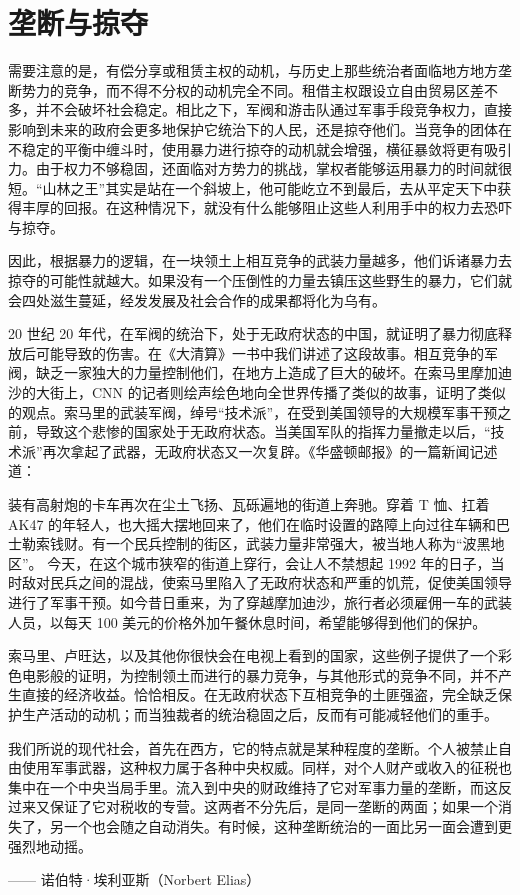 \section{垄断与掠夺}
需要注意的是，有偿分享或租赁主权的动机，与历史上那些统治者面临地方地方垄断势力的竞争，而不得不分权的动机完全不同。租借主权跟设立自由贸易区差不多，并不会破坏社会稳定。相比之下，军阀和游击队通过军事手段竞争权力，直接影响到未来的政府会更多地保护它统治下的人民，还是掠夺他们。当竞争的团体在不稳定的平衡中缠斗时，使用暴力进行掠夺的动机就会增强，横征暴敛将更有吸引力。由于权力不够稳固，还面临对方势力的挑战，掌权者能够运用暴力的时间就很短。“山林之王”其实是站在一个斜坡上，他可能屹立不到最后，去从平定天下中获得丰厚的回报。在这种情况下，就没有什么能够阻止这些人利用手中的权力去恐吓与掠夺。

因此，根据暴力的逻辑，在一块领土上相互竞争的武装力量越多，他们诉诸暴力去掠夺的可能性就越大。如果没有一个压倒性的力量去镇压这些野生的暴力，它们就会四处滋生蔓延，经发发展及社会合作的成果都将化为乌有。

20 世纪 20 年代，在军阀的统治下，处于无政府状态的中国，就证明了暴力彻底释放后可能导致的伤害。在《大清算》一书中我们讲述了这段故事。相互竞争的军阀，缺乏一家独大的力量控制他们，在地方上造成了巨大的破坏。在索马里摩加迪沙的大街上，CNN 的记者则绘声绘色地向全世界传播了类似的故事，证明了类似的观点。索马里的武装军阀，绰号“技术派”，在受到美国领导的大规模军事干预之前，导致这个悲惨的国家处于无政府状态。当美国军队的指挥力量撤走以后，“技术派”再次拿起了武器，无政府状态又一次复辟。《华盛顿邮报》的一篇新闻记述道：

\begin{tcolorbox}
装有高射炮的卡车再次在尘土飞扬、瓦砾遍地的街道上奔驰。穿着 T 恤、扛着 AK47 的年轻人，也大摇大摆地回来了，他们在临时设置的路障上向过往车辆和巴士勒索钱财。有一个民兵控制的街区，武装力量非常强大，被当地人称为“波黑地区”。
今天，在这个城市狭窄的街道上穿行，会让人不禁想起 1992 年的日子，当时敌对民兵之间的混战，使索马里陷入了无政府状态和严重的饥荒，促使美国领导进行了军事干预。如今昔日重来，为了穿越摩加迪沙，旅行者必须雇佣一车的武装人员，以每天 100 美元的价格外加午餐休息时间，希望能够得到他们的保护。
\end{tcolorbox}

索马里、卢旺达，以及其他你很快会在电视上看到的国家，这些例子提供了一个彩色电影般的证明，为控制领土而进行的暴力竞争，与其他形式的竞争不同，并不产生直接的经济收益。恰恰相反。在无政府状态下互相竞争的土匪强盗，完全缺乏保护生产活动的动机；而当独裁者的统治稳固之后，反而有可能减轻他们的重手。

\begin{tcolorbox}
我们所说的现代社会，首先在西方，它的特点就是某种程度的垄断。个人被禁止自由使用军事武器，这种权力属于各种中央权威。同样，对个人财产或收入的征税也集中在一个中央当局手里。流入到中央的财政维持了它对军事力量的垄断，而这反过来又保证了它对税收的专营。这两者不分先后，是同一垄断的两面；如果一个消失了，另一个也会随之自动消失。有时候，这种垄断统治的一面比另一面会遭到更强烈地动摇。
\begin{flushright}
—— 诺伯特·埃利亚斯（Norbert Elias）
\end{flushright}
\end{tcolorbox}

